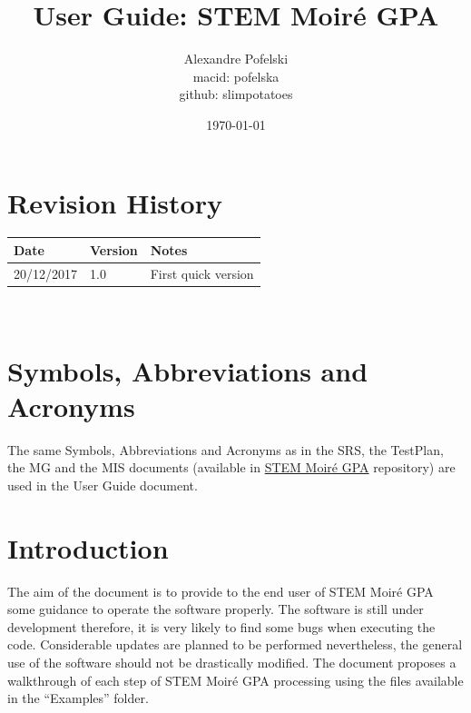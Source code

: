 \documentclass[12pt, titlepage]{article}
\newcommand{\progname}{STEM Moir{\'e} GPA}
\begin{document}
\title{User Guide: STEM Moir{\'e} GPA} 
\author{Alexandre Pofelski \\
		macid: pofelska \\
		github: slimpotatoes}
\date{\today}
	
\maketitle


\section{Revision History}

\begin{tabularx}{\textwidth}{p{3cm}p{2cm}X}
\toprule {\bf Date} & {\bf Version} & {\bf Notes}\\
\midrule
20/12/2017 & 1.0 & First quick version\\
\bottomrule
\end{tabularx}

~\newpage

\section{Symbols, Abbreviations and Acronyms}

The same Symbols, Abbreviations and Acronyms as in the SRS, the TestPlan, the 
MG and the MIS documents (available in 
\href{https://github.com/slimpotatoes/STEM_Moire_GPA}{\progname{}} repository) 
are used in the User Guide document. 

\newpage

\tableofcontents

\listoftables %

\listoffigures %

\newpage


\section{Introduction}

The aim of the document is to provide to the end user of \progname{} some guidance to operate the software properly. The software is still under development therefore, it is very likely to find some bugs when executing the code. Considerable updates are planned to be performed nevertheless, the general use of the software should not be drastically modified. The document proposes a walkthrough of each step of \progname{} processing using the files available in the \enquote{Examples} folder.
\end{document}
